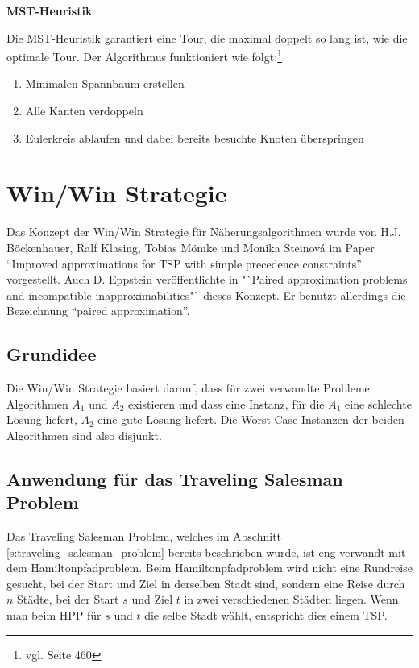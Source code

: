 \documentclass[11pt,a4paper]{article}
\begin{document}
\medskip

\begin{flushleft}
\textbf{MST-Heuristik}

Die MST-Heuristik garantiert eine Tour, die maximal doppelt so lang ist, wie die optimale Tour. Der Algorithmus funktioniert wie folgt:\footnote{vgl. \cite{teschl06} Seite 460}

\begin{enumerate}
    \item Minimalen Spannbaum erstellen
    \item Alle Kanten verdoppeln
    \item Eulerkreis ablaufen und dabei bereits besuchte Knoten überspringen
\end{enumerate}

\end{flushleft}
\newpage
\section{Win/Win Strategie}
Das Konzept der Win/Win Strategie für Näherungsalgorithmen wurde von H.J. Böckenhauer, Ralf Klasing, Tobias Mömke und Monika Steinová im Paper "`Improved approximations for TSP with simple precedence constraints"'\cite{boeckenhauer10} vorgestellt.  Auch D. Eppstein veröffentlichte in "`Paired approximation problems and incompatible inapproximabilities"`\cite{eppstein10} dieses Konzept. Er benutzt allerdings die Bezeichnung "`paired approximation"'.


\subsection{Grundidee}
Die Win/Win Strategie basiert darauf, dass für zwei verwandte Probleme Algorithmen $A_1$ und $A_2$ existieren und dass eine Instanz, für die $A_1$ eine schlechte Lösung liefert, $A_2$ eine gute Lösung liefert. Die Worst Case Instanzen der beiden Algorithmen sind also disjunkt.

\subsection{Anwendung für das Traveling Salesman Problem}
Das Traveling Salesman Problem, welches im Abschnitt \ref{s:traveling_salesman_problem} bereits beschrieben wurde, ist eng verwandt mit dem Hamiltonpfadproblem. Beim Hamiltonpfadproblem wird nicht eine Rundreise gesucht, bei der Start und Ziel in derselben Stadt sind, sondern eine Reise durch $n$ Städte, bei der Start $s$ und Ziel $t$ in zwei verschiedenen Städten liegen. Wenn man beim HPP für $s$ und $t$ die selbe Stadt wählt, entspricht dies einem TSP.
\end{document}
